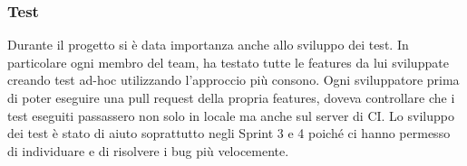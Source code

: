 \subsubsection{Test}
Durante il progetto si è data importanza anche allo sviluppo dei test.
In particolare ogni membro del team, ha testato tutte le features da lui sviluppate creando test ad-hoc utilizzando l'approccio più consono.
Ogni sviluppatore prima di poter eseguire una pull request della propria features, doveva controllare che i test eseguiti passassero non solo in locale ma anche sul server di CI.
Lo sviluppo dei test è stato di aiuto soprattutto negli Sprint 3 e 4 poiché ci hanno permesso di individuare e di risolvere i bug più velocemente.

\newpage